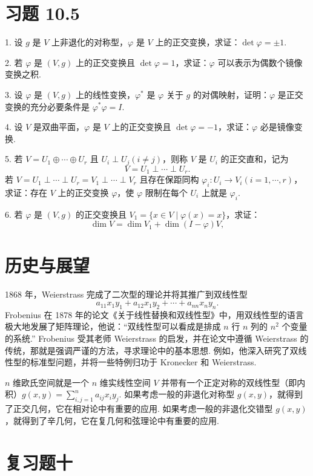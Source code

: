 \documentclass[UTF8, 12pt, fontset=fandol, oneside]{ctexart}
\begin{document}
\section*{习题 10.5}

1. 设 $g$ 是 $V$ 上非退化的对称型，$\varphi$ 是 $V$ 上的正交变换，求证：$\det\varphi=\pm1$.

2. 若 $\varphi$ 是 $(V,g)$ 上的正交变换且 $\det\varphi=1$，求证：$\varphi$ 可以表示为偶数个镜像变换之积.

3. 设 $\varphi$ 是 $(V,g)$ 上的线性变换，$\varphi^*$ 是 $\varphi$ 关于 $g$ 的对偶映射，证明：$\varphi$ 是正交变换的充分必要条件是 $\varphi^*\varphi=I$.

4. 设 $V$ 是双曲平面，$\varphi$ 是 $V$ 上的正交变换且 $\det\varphi=-1$，求证：$\varphi$ 必是镜像变换.

5. 若 $V=U_1\oplus\cdots\oplus U_r$ 且 $U_i\perp U_j(i\ne j)$，则称 $V$ 是 $U_i$ 的正交直和，记为
\[
  V=U_1\perp\cdots\perp U_r.
\]
若 $V=U_1\perp\cdots\perp U_r=V_1\perp\cdots\perp V_r$ 且存在保距同构 $\varphi_i:U_i\to V_i(i=1,\cdots,r)$，求证：存在 $V$ 上的正交变换 $\varphi$，使 $\varphi$ 限制在每个 $U_i$ 上就是 $\varphi_i$.

6. 若 $\varphi$ 是 $(V,g)$ 的正交变换且 $V_1=\{x\in V\mid \varphi(x)=x\}$，求证：
\[
  \dim V=\dim V_1+\dim(I-\varphi)V,
\]

\section*{历史与展望}

1868 年，Weierstrass 完成了二次型的理论并将其推广到双线性型
\[
  a_{11}x_1y_1+a_{12}x_1y_2+\cdots+a_{nn}x_ny_n.
\]
Frobenius 在 1878 年的论文《关于线性替换和双线性型》中，用双线性型的语言极大地发展了矩阵理论，他说：“双线性型可以看成是排成 $n$ 行 $n$ 列的 $n^2$ 个变量的系统.” Frobenius 受其老师 Weierstrass 的启发，并在论文中遵循 Weierstrass 的传统，那就是强调严谨的方法，寻求理论中的基本思想. 例如，他深入研究了双线性型的标准型问题，并将一些特例归功于 Kronecker 和 Weierstrass.

$n$ 维欧氏空间就是一个 $n$ 维实线性空间 $V$ 并带有一个正定对称的双线性型（即内积）$g(x,y)=\sum_{i,j=1}^n a_{ij}x_iy_j$. 如果考虑一般的非退化对称型 $g(x,y)$，就得到了正交几何，它在相对论中有重要的应用. 如果考虑一般的非退化交错型 $g(x,y)$，就得到了辛几何，它在复几何和弦理论中有重要的应用.

\section*{复习题十}
\end{document}
